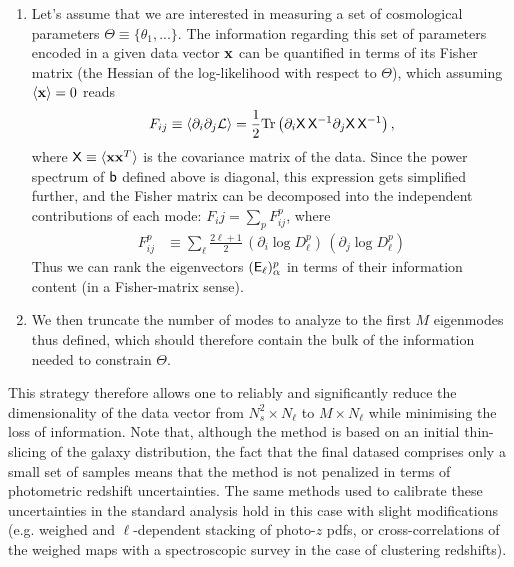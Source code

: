 \documentclass[twocolumn,amsfont,amssymb,amsmath, showpacs,balancelastpage, nofootinbib]{revtex4-1}
\begin{document}
\begin{enumerate}
      \item Let's assume that we are interested in measuring a set of cosmological parameters $\Theta\equiv\{\theta_1,...\}$. The information regarding this set of parameters encoded in a given data vector ${\bf x}$ can be quantified in terms of its Fisher matrix (the Hessian of the log-likelihood with respect to $\Theta$), which assuming $\langle{\bf x}\rangle=0$ reads
      \begin{equation}
        F_{ij}\equiv\left\langle\partial_i\partial_j{\cal L}\right\rangle=\frac{1}{2}{\rm Tr}\left(\partial_i{\sf X}\,{\sf X}^{-1}\partial_j{\sf X}\,{\sf X}^{-1}\right),
      \end{equation}
      where ${\sf X}\equiv\langle {\bf x}{\bf x}^T\rangle$ is the covariance matrix of the data. Since the power spectrum of ${\sf b}$ defined above is diagonal, this expression gets simplified further, and the Fisher matrix can be decomposed into the independent contributions of each mode: $F_ij=\sum_p F^p_{ij}$, where
      \begin{align}        
        F^p_{ij}&\equiv\sum_\ell\frac{2\ell+1}{2}\,(\partial_i\log D^p_\ell)\,(\partial_j\log D^p_\ell)
      \end{align}
      Thus we can rank the eigenvectors $({\sf E}_\ell)^p_\alpha$ in terms of their information content (in a Fisher-matrix sense).
      \item We then truncate the number of modes to analyze to the first $M$ eigenmodes thus defined, which should therefore contain the bulk of the information needed to constrain $\Theta$.
    \end{enumerate}
    This strategy therefore allows one to reliably and significantly reduce the dimensionality of the data vector from $N_s^2\times N_\ell$ to $M\times N_\ell$ while minimising the loss of information. Note that, although the method is based on an initial thin-slicing of the galaxy distribution, the fact that the final datased comprises only a small set of samples means that the method is not penalized in terms of photometric redshift uncertainties. The same methods used to calibrate these uncertainties in the standard analysis hold in this case with slight modifications (e.g. weighed and $\ell$-dependent stacking of photo-$z$ pdfs, or cross-correlations of the weighed maps with a spectroscopic survey in the case of clustering redshifts).
  
\end{document}
